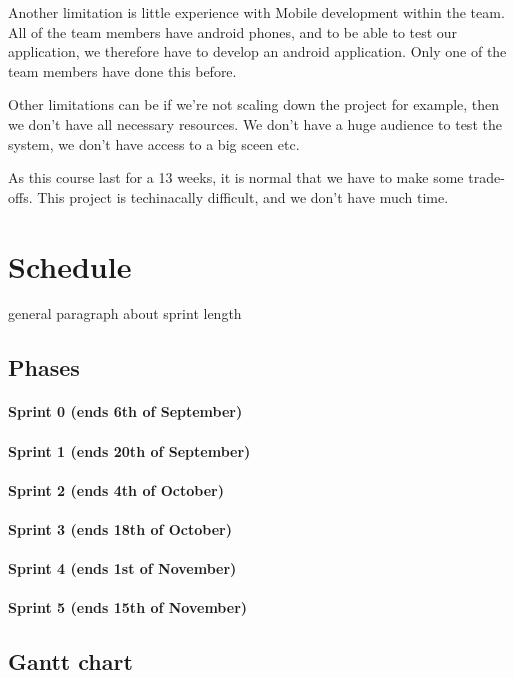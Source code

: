 \documentclass{article}
\begin{document}
Another limitation is little experience with Mobile development within the team. All of the team members have android phones, and to be able to test our application, we therefore have to develop an android application. Only one of the team members have done this before. 

Other limitations can be if we're not scaling down the project for example, then we don't have all necessary resources. We don't have a huge audience to test the system, we don't have access to a big sceen etc.   

As this course last for a 13 weeks, it is normal that we have to make some trade-offs.
This project is techinacally difficult, and we don't have much time.  
  
\section{Schedule}
general paragraph about sprint length
\subsection{Phases}
\paragraph{Sprint 0 (ends 6th of September)}
\paragraph{Sprint 1 (ends 20th of September)}
\paragraph{Sprint 2 (ends 4th of October)}
\paragraph{Sprint 3 (ends 18th of October)}
\paragraph{Sprint 4 (ends 1st of November)}
\paragraph{Sprint 5 (ends 15th of November)}
\subsection{Gantt chart}
\end{document}
